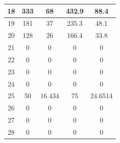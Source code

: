 \documentclass{article}
\begin{document}
\begin{table}[H]
\begin{tabular}{|c|c|c|c|c|}
18  & 333           & 68             & 432.9       & 88.4         \\ \hline
19  & 181           & 37             & 235.3       & 48.1         \\ \hline
20  & 128           & 26             & 166.4       & 33.8         \\ \hline
21  & 0             & 0              & 0           & 0            \\ \hline
22  & 0             & 0              & 0           & 0            \\ \hline
23  & 0             & 0              & 0           & 0            \\ \hline
24  & 0             & 0              & 0           & 0            \\ \hline
25  & 50            & 16.434         & 75          & 24.6514      \\ \hline
26  & 0             & 0              & 0           & 0            \\ \hline
27  & 0             & 0              & 0           & 0            \\ \hline
28  & 0             & 0              & 0           & 0            \\ \hline

\end{tabular}
\label{Demandas}
\end{table}
\end{document}
